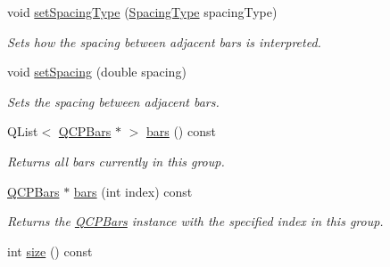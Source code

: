\begin{DoxyCompactItemize}
\item 
void \hyperlink{classQCPBarsGroup_a2c7e2d61b10594a4555b615e1fcaf49e}{set\+Spacing\+Type} (\hyperlink{classQCPBarsGroup_a4c0521120a97e60bbca37677a37075b6}{Spacing\+Type} spacing\+Type)
\begin{DoxyCompactList}\small\item\em Sets how the spacing between adjacent bars is interpreted. \end{DoxyCompactList}\item 
void \hyperlink{classQCPBarsGroup_aa553d327479d72a0c3dafcc724a190e2}{set\+Spacing} (double spacing)
\begin{DoxyCompactList}\small\item\em Sets the spacing between adjacent bars. \end{DoxyCompactList}\item 
Q\+List$<$ \hyperlink{classQCPBars}{Q\+C\+P\+Bars} $\ast$ $>$ \hyperlink{classQCPBarsGroup_a7c72ed1f8cd962c93b8c42ab96cd91ec}{bars} () const 
\begin{DoxyCompactList}\small\item\em Returns all bars currently in this group. \end{DoxyCompactList}\item 
\hyperlink{classQCPBars}{Q\+C\+P\+Bars} $\ast$ \hyperlink{classQCPBarsGroup_a72d022790b7c93151c95c28eefaf51b4}{bars} (int index) const 
\begin{DoxyCompactList}\small\item\em Returns the \hyperlink{classQCPBars}{Q\+C\+P\+Bars} instance with the specified {\itshape index} in this group. \end{DoxyCompactList}\item 
\hypertarget{classQCPBarsGroup_af07364189c5717a158ec95b609687532}{}int \hyperlink{classQCPBarsGroup_af07364189c5717a158ec95b609687532}{size} () const \label{classQCPBarsGroup_af07364189c5717a158ec95b609687532}


\end{DoxyCompactItemize}

